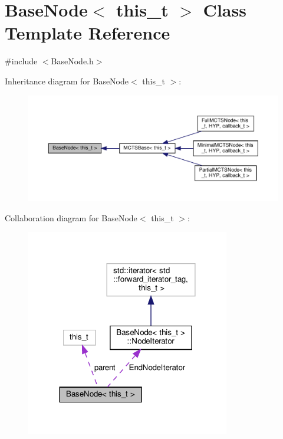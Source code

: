 \hypertarget{class_base_node}{}\section{Base\+Node$<$ this\+\_\+t $>$ Class Template Reference}
\label{class_base_node}


{\ttfamily \#include $<$Base\+Node.\+h$>$}



Inheritance diagram for Base\+Node$<$ this\+\_\+t $>$\+:
\nopagebreak
\begin{figure}[H]
\begin{center}
\leavevmode
\includegraphics[width=350pt]{class_base_node__inherit__graph}
\end{center}
\end{figure}


Collaboration diagram for Base\+Node$<$ this\+\_\+t $>$\+:
\nopagebreak
\begin{figure}[H]
\begin{center}
\leavevmode
\includegraphics[width=252pt]{class_base_node__coll__graph}
\end{center}
\end{figure}
